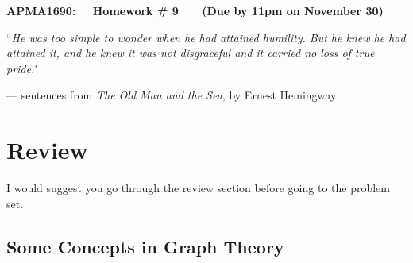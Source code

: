 \documentclass[11pt,letterpaper, leqno]{article}
\numberwithin{equation}{section}
\numberwithin{theorem}{section}
\numberwithin{lemma}{section}
\numberwithin{corollary}{section}
\numberwithin{definition}{section}
\numberwithin{proposition}{section}
\numberwithin{remark}{section}
\numberwithin{example}{section}
\begin{document}
\begin{center}
{\bf \Large APMA1690: ~~Homework \# 9 ~~~(Due by 11pm on November 30)}
\end{center}

\medskip

\begin{center}
    ``\textit{He was too simple to wonder when he had attained humility. But he knew he had attained it, and he knew it was not disgraceful and it carried no loss of true pride.}"
\end{center}
\begin{flushright}
--- sentences from \textit{The Old Man and the Sea}, by Ernest Hemingway
\end{flushright}

\section{Review}

I would suggest you go through the review section before going to the problem set.

\subsection{Some Concepts in Graph Theory}
\end{document}
